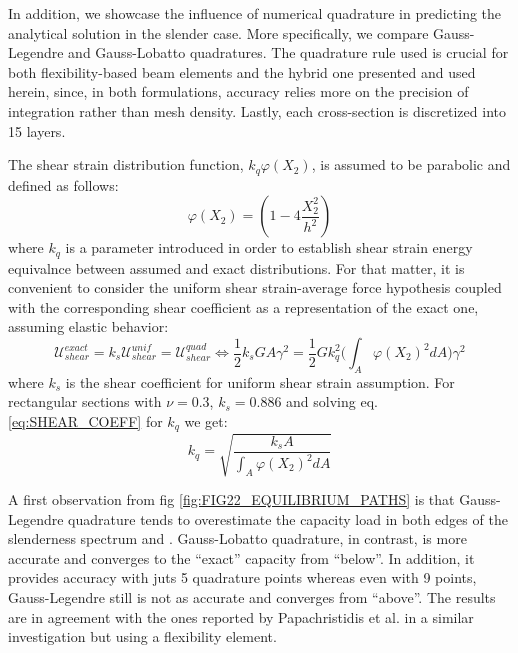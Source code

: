  In addition, we showcase the 
influence of numerical quadrature in predicting the analytical solution in the 
slender case. More specifically, we compare Gauss-Legendre and Gauss-Lobatto 
quadratures. The quadrature rule used is crucial for both flexibility-based 
beam elements and the hybrid one presented and used herein, since, in both 
formulations, accuracy relies more on the precision of integration rather than 
mesh density. Lastly, each cross-section is discretized into 15 layers.

The shear strain distribution function, $k_q\varphi(X_2)$, is assumed to be 
parabolic and defined as follows:
\begin{equation}
	\varphi(X_2) = (1-4\frac{X_2^2}{h^2})
	\label{eq:SHEAR_DISTR_FUN}
\end{equation}
\noindent where $k_q$ is a parameter introduced in order to establish shear 
strain energy equivalnce between assumed and exact distributions. For that 
matter, it is convenient to consider the uniform shear strain-average force 
hypothesis coupled with the corresponding shear coefficient as a representation 
of the exact one, assuming elastic behavior:
\begin{equation}
	\mathcal{U}_{shear}^{exact}=k_s\mathcal{U}_{shear}^{unif} = 
	\mathcal{U}_{shear}^{quad}\Longleftrightarrow 
	\frac{1}{2}k_sGA\gamma ^2=\frac{1}{2}G k_q^2\bigg(\int_A \varphi(X_2)^2 dA 
	\bigg) \gamma ^2
	\label{eq:SHEAR_COEFF}
\end{equation}
\noindent where $k_s$ is the shear coefficient for uniform shear strain 
assumption. For rectangular sections with $\nu=0.3$, 
$k_s=0.886$ and solving eq. \ref{eq:SHEAR_COEFF} for $k_q$ we 
get:
\begin{equation}
	k_q = \sqrt{\frac{k_s A}{\int_A \varphi(X_2)^2 dA}}
	\label{eq:QUAD_COEFF}
\end{equation}

A first observation from fig \ref{fig:FIG22_EQUILIBRIUM_PATHS} is that 
Gauss-Legendre quadrature tends to overestimate the capacity load in both edges 
of the slenderness spectrum and . Gauss-Lobatto quadrature, in contrast, is 
more accurate and converges to the ``exact'' capacity from ``below''. In 
addition, it provides accuracy with juts 5 quadrature points whereas even with 
9 points, Gauss-Legendre still is not as accurate and converges from ``above''. 
The results are in agreement with the ones reported by Papachristidis et 
al.\cite{Papachristidis2010} in a similar investigation but using a flexibility 
element.

